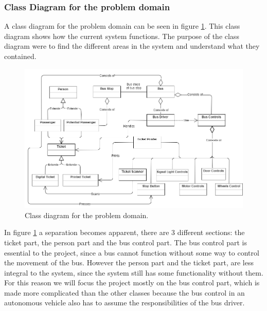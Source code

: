 \subsubsection{Class Diagram for the problem domain}




A class diagram for the problem domain can be seen in figure \ref{problem-domain-class-diagram}. This class diagram shows how the current system functions. The purpose of the class diagram were to find the different areas in the system and understand what they contained.
\begin{figure}[H]
\centering
\includegraphics[scale=0.49]{Images/problem_domain_class_diagram.png}
\caption{Class diagram for the problem domain.}
\label{problem-domain-class-diagram}
\end{figure}

In figure \ref{problem-domain-class-diagram} a separation becomes apparent, there are 3 different sections: the ticket part, the person part and the bus control part. The bus control part is essential to the project, since a bus cannot function without some way to control the movement of the bus. However the person part and the ticket part, are less integral to the system, since the system still has some functionality without them. For this reason we will focus the project mostly on the bus control part, which is made more complicated than the other classes because the bus control in an autonomous vehicle also has to assume the responsibilities of the bus driver.


